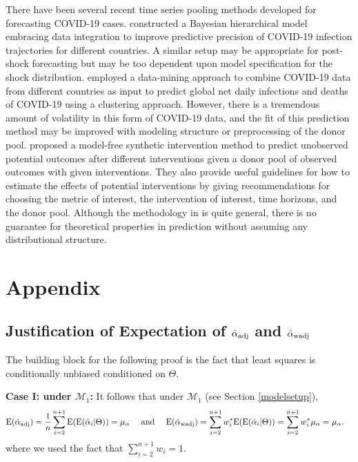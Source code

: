 \documentclass[11pt]{article}
\def\mc#1{\mathcal{#1}} %
\def\E#1{\mathrm{E}(#1)} %
\theoremstyle{definition}
\begin{document}
There have been several recent time series pooling methods developed for forecasting COVID-19 cases. \citet{lee2020estimation} constructed a Bayesian hierarchical model embracing data integration to improve predictive precision of COVID-19 infection trajectories for different countries. A similar setup may be appropriate for post-shock forecasting but may be too dependent upon model specification for the shock distribution. \citet{plessen2020integrated} employed a data-mining approach to combine COVID-19 data from different countries as input to predict global net daily infections and deaths of COVID-19 using a clustering approach. However, there is a tremendous amount of volatility in this form of COVID-19 data, and the fit of this prediction method may be improved with modeling structure or preprocessing of the donor pool. \citet{agarwal2020two} proposed a model-free synthetic intervention method to predict unobserved potential outcomes after different interventions given a donor pool of observed outcomes with given interventions. They also provide useful guidelines for how to estimate the effects of potential interventions by giving recommendations for choosing the metric of interest, the intervention of interest, time horizons, and the donor pool. Although the methodology in \citet{agarwal2020two} is quite general, there is no guarantee for theoretical properties in prediction without assuming any distributional structure.


\section{Appendix}
\label{proofs}

\subsection{Justification of Expectation of $\hat{\alpha}_{\rm adj}$ and $\hat{\alpha}_{\rm wadj}$}
\label{exp}

The building block for the following proof is the fact that least squares is conditionally unbiased conditioned on $\Theta$. 

\noindent \textbf{Case I: under $\mc{M}_{1}$:} It follows that  under $\mc{M}_{1}$ (see Section \ref{modelsetup}),
\begin{align*}
\E{\hat{\alpha}_{\rm adj}} =\frac{1}{n}  \sum_{i=2}^{n+1} \E{\E{\hat{\alpha}_i|\Theta}} = \mu_{\alpha} 
\quad \text{ and } \quad \E{\hat{\alpha}_{\rm wadj}}&= \sum_{i=2}^{n+1} w_i^* \E{\E{\hat{\alpha}_i|\Theta}}= \sum_{i=2}^{n+1} w_i^*\mu_{\alpha}= \mu_{\alpha}.
\end{align*}
where we used the fact that $\sum_{i=2}^{n+1} w_i=1$. 
\end{document}
